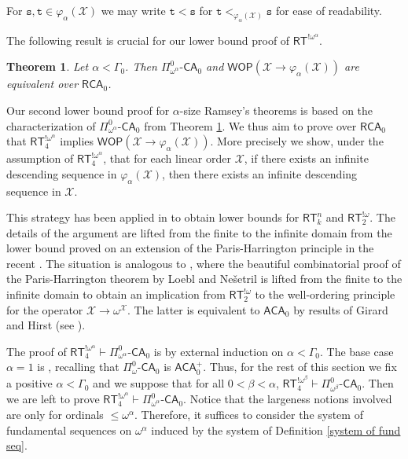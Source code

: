 \documentclass[11pt]{amsart}
\newtheorem{theorem}[thm]{Theorem}
\theoremstyle{definition}
\theoremstyle{remark}
\theoremstyle{plain}
\def\X{\mathcal{X}}
\def\om{\omega}
\def\a{\alpha}
\def\b{\beta}
\def\G{\Gamma}
\newcommand{\RCA}{\mathsf{RCA}_0}
\newcommand{\ACA}{\mathsf{ACA}_0}
\newcommand{\RT}{\mathsf{RT}}
\newcommand{\CA}{\mathsf{\text{-}CA}_0}
\newcommand{\lorenzo}[1]{\textcolor{blue}{#1}}
\begin{document}
For $\mathtt{s}, \mathtt{t}\in \varphi_\a(\X)$ we may write $\mathtt{t} < \mathtt{s}$ for $\mathtt{t} <_{\varphi_\a(\X)} \mathtt{s}$ for ease of readability.

The following result is crucial for our lower bound proof of $\RT^{!\omega^\alpha}$. 

\begin{theorem}\label{wop mm11}\cite[Theorem 6.16]{marconemontalban}
Let $\a < \G_0$.
Then $\Pi^0_{\om^\a} \CA$ and $ \mathsf{WOP} (\X \to \varphi_\a(\X))$ are equivalent over $\RCA$.
\end{theorem}

Our second lower bound proof for $\a$-size Ramsey's theorems is based on the characterization of $\Pi^0_{\omega^\a} \CA$ from Theorem \ref{wop mm11}. 
We thus aim to prove over  $\RCA$ that $\RT^{!\omega^\alpha}_4$ implies $\mathsf{WOP} (\X \to \varphi_\a(\X))$. 
More precisely we show, under the assumption of $\RT^{!\omega^\alpha}_4$, that for each linear order $\X$, if there exists an infinite descending sequence in $\varphi_\alpha (\X)$, then there exists an infinite descending sequence in $\X$.

This strategy has been applied 
in \cite{carlucci2025} to obtain lower bounds for $\RT^n_k$ and $\RT^{! \omega}_2$. The details of the argument are lifted from the finite to the infinite domain from the lower bound proved on an extension of the Paris-Harrington principle in the recent \cite{marcone2025}. 
The situation is analogous to \cite{carlucci2025}, where the beautiful combinatorial proof of the Paris-Harrington theorem by Loebl and Ne\v{s}etril \cite{Loe-Nes:92} is lifted from the finite to the infinite domain to obtain an implication from $\RT^{! \om}_2$ to the well-ordering principle for the operator $\X \to \omega^\X$. 
The latter is equivalent to $\ACA$ by results of Girard and Hirst (see \cite{marconemontalban}).

The proof of $\RT_4^{!\om^\a} \vdash \Pi^0_{\omega^\a} \CA$ is by external induction on $\a<\G_0$.
The base case $\a=1$ is \cite[Theorem 3.6]{carlucci2014}, recalling that $\Pi^0_{\omega} \CA$ is $\ACA^+$. Thus, for the rest of this section we fix a positive $\a < \G_0$ and we suppose that for all $0 < \b < \a$, $\RT^{!\om^\b}_4 \vdash \Pi^0_{\omega^\b} \CA$.
Then we are left to prove $\RT_4^{!\om^\a} \vdash \Pi^0_{\omega^\a} \CA$.
Notice that the largeness notions involved are only for ordinals $\le \om^\a$.
Therefore, it suffices to consider the system of fundamental sequences on $\om^\a$ induced by the system of Definition \ref{system of fund seq}.
\end{document}
